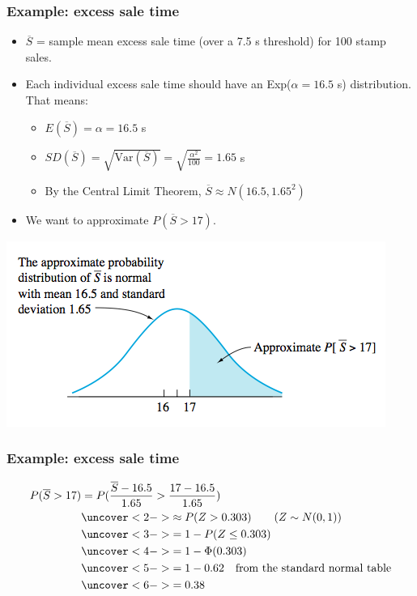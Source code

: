 \documentclass[handout]{beamer}\usepackage{graphicx, color}
\providecommand{\ov}[1]{\overline{#1}}
\numberwithin{equation}{section}
\begin{document}
\begin{frame}
\frametitle{Example: excess sale time}
\begin{itemize}
\pause \item $\ov{S}$ = sample mean excess sale time (over a 7.5 s threshold) for 100 stamp sales.
\pause \item Each individual excess sale time should have an Exp($\alpha = 16.5$ s) distribution. That means:
\begin{itemize}
\pause \item $E(\ov{S}) = \alpha = 16.5$ s
\pause \item $SD(\ov{S}) = \sqrt{\text{Var}(\ov{S})} = \sqrt{\frac{\alpha^2}{100}} = 1.65$ s
\pause \item By the Central Limit Theorem, $\ov{S} \approx N(16.5, 1.65^2)$
\end{itemize}
\pause \item We want to approximate $P(\ov{S} > 17)$.
\end{itemize}
 \includegraphics{../../fig/salesnorm.png}
\end{frame}


\begin{frame}
\frametitle{Example: excess sale time}
\begin{align*}
P(\ov{S} > 17) &= P(\frac{\ov{S} - 16.5}{1.65} > \frac{17 - 16.5}{1.65})\\
&\uncover<2->{\approx P(Z > 0.303) \qquad (Z \sim N(0,1))} \\
&\uncover<3->{= 1 - P(Z \le 0.303)} \\
& \uncover<4->{= 1 - \Phi(0.303)} \\
&\uncover<5->{ = 1 - 0.62 \quad \text{from the standard normal table} }\\
&\uncover<6->{= 0.38}
\end{align*}
\end{frame}
\end{document}
